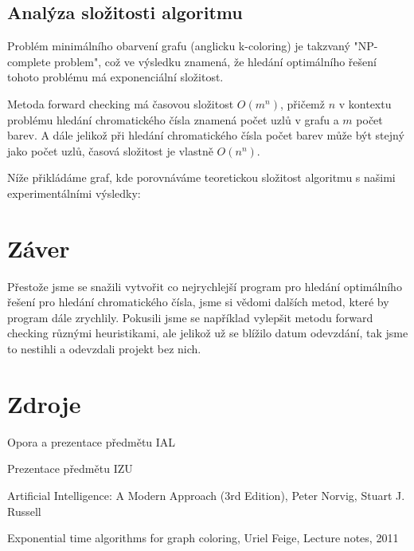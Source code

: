 \documentclass[a4paper,11pt]{article}
\begin{document}
\subsection{Analýza složitosti algoritmu}
Problém minimálního obarvení grafu (anglicku k-coloring) je takzvaný "NP-complete problem", což ve výsledku znamená, že hledání optimálního řešení tohoto problému má exponenciální složitost.

Metoda forward checking má časovou složitost $O(m^n)$, přičemž $n$ v kontextu problému hledání chromatického čísla znamená počet uzlů v grafu a $m$ počet barev. A dále jelikož při hledání chromatického čísla počet barev může být stejný jako počet uzlů, časová složitost je vlastně $O(n^n)$.

Níže přikládáme graf, kde porovnáváme teoretickou složitost algoritmu s našimi experimentálními výsledky:



\section{Záver}
Přestože jsme se snažili vytvořit co nejrychlejší program pro hledání optimálního řešení pro hledání chromatického čísla, jsme si vědomi dalších metod, které by program dále zrychlily. Pokusili jsme se například vylepšit metodu forward checking různými heuristikami, ale jelikož už se blížilo datum odevzdání, tak jsme to nestihli a odevzdali projekt bez nich.


\section{Zdroje}
\begin{compactitem}
\item Opora a prezentace předmětu IAL
\item Prezentace předmětu IZU
\item Artificial Intelligence: A Modern Approach (3rd Edition), Peter Norvig, Stuart J. Russell
\item Exponential time algorithms for graph coloring, Uriel Feige, Lecture notes, 2011
\end{compactitem}
\end{document}
